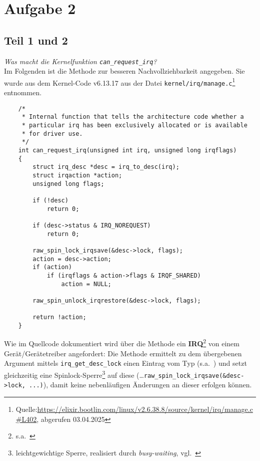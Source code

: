 \chapter{Aufgabe 2}

\section{Teil 1 und 2}

\textit{Was macht die Kernelfunktion \texttt{can\_request\_irq}?}\\

\noindent
Im Folgenden ist die Methode zur besseren Nachvollziehbarkeit angegeben.
Sie wurde aus dem Kernel-Code v6.13.17 aus der Datei \texttt{kernel/irq/manage.c}\footnote{
Quelle:\url{https://elixir.bootlin.com/linux/v2.6.38.8/source/kernel/irq/manage.c#L402}, abgerufen 03.04.2025
} entnommen.\\

\begin{verbatim}
    /*
     * Internal function that tells the architecture code whether a
     * particular irq has been exclusively allocated or is available
     * for driver use.
     */
    int can_request_irq(unsigned int irq, unsigned long irqflags)
    {
        struct irq_desc *desc = irq_to_desc(irq);
        struct irqaction *action;
        unsigned long flags;

        if (!desc)
            return 0;

        if (desc->status & IRQ_NOREQUEST)
            return 0;

        raw_spin_lock_irqsave(&desc->lock, flags);
        action = desc->action;
        if (action)
            if (irqflags & action->flags & IRQF_SHARED)
                action = NULL;

        raw_spin_unlock_irqrestore(&desc->lock, flags);

        return !action;
    }
\end{verbatim}

\noindent
Wie im Quellcode dokumentiert wird über die Methode ein \textbf{IRQ}\footnote{s.a.~\cite[52]{Man20d}} von einem Gerät/Gerätetreiber angefordert: Die Methode ermittelt zu dem übergebenen Argument  mittels \texttt{irq\_get\_desc\_lock} einen Eintrag vom Typ  (s.a.~\cite[64 f.]{Man20d}) und setzt gleichzeitig eine Spinlock-Sperre\footnote{
    leichtgewichtige Sperre, realisiert durch \textit{busy-waiting}, vgl.~\cite[150]{Man20g}
} auf diese  (\ldots \texttt{raw\_spin\_lock\_irqsave(&desc->lock, ...)}), damit keine nebenläufigen Änderungen an dieser erfolgen können.\\

